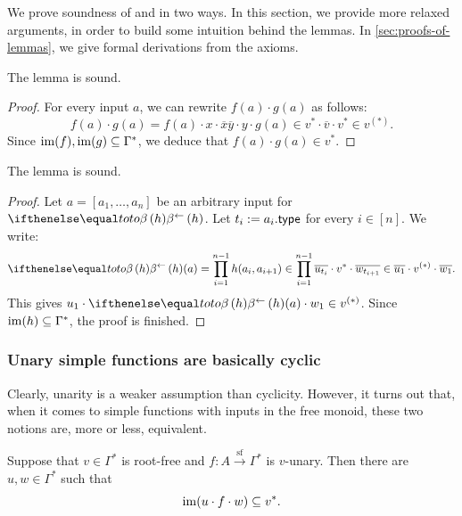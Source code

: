 
We prove soundness of  and  in two ways. In this section, we provide more relaxed arguments, in order to build some intuition behind the lemmas. In \cref{sec:proofs-of-lemmas}, we give formal derivations from the axioms.

\begin{claim}
    The lemma  is sound.
\end{claim}

\begin{proof}
    For every input $a$, we can rewrite $f(a) \cdot g(a)$ as follows:
    \[
        f(a) \cdot g(a) = f(a) \cdot x \cdot \overline x \overline y \cdot y \cdot g(a) \in v^* \cdot \overline{v} \cdot v^* \in v^{(*)}.
    \]
    Since $\operatorname{\mathrm{im}}(f), \operatorname{\mathrm{im}}(g) \subseteq \Gamma^*$, we deduce that $f(a) \cdot g(a) \in v^*$. 
\end{proof}

\begin{claim}
    The lemma  is sound.
\end{claim}

\begin{proof}
    Let $a = [a_1, \dots, a_n]$ be an arbitrary input for $\bihom{to, h}$. Let $t_i := a_i . \mathsf{type}$ for every $i \in [n]$. We write:
    \[
        \bihom{to, h}(a) = \prod_{i=1}^{n-1} h(a_i, a_{i+1}) \in \prod_{i=1}^{n-1} \overline{u_{t_i}} \cdot v^* \cdot \overline{w_{t_{i+1}}} \in \overline{u_1} \cdot v^{(*)} \cdot \overline{w_1}.
    \]
    This gives $u_1 \cdot \bihom{to, h}(a) \cdot w_1 \in v^{(*)}$. Since $\operatorname{\mathrm{im}}(h) \subseteq \Gamma^*$, the proof is finished. 
\end{proof}

\subsubsection{Unary simple functions are basically cyclic}

Clearly, unarity is a weaker assumption than cyclicity. However, it turns out that, when it comes to simple functions with inputs in the free monoid, these two notions are, more or less, equivalent. 

\begin{lemma}\label{lem:unary-is-the-same-as-cyclic}
    Suppose that $v \in \Gamma^*$ is root-free and $f : A \xrightarrow{\mathrm{sf}} \Gamma^*$ is $v$-unary. Then there are $u,w \in \Gamma^*$ such that 
    \[
        \operatorname{\mathrm{im}}(u \cdot f \cdot w) \subseteq v^*. 
    \]
\end{lemma}

